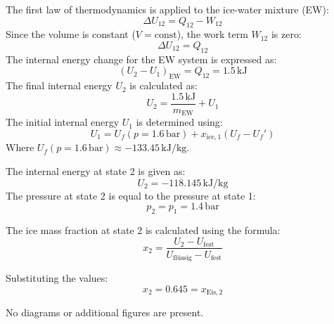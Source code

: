 The first law of thermodynamics is applied to the ice-water mixture (EW):  
\[
\Delta U_{12} = Q_{12} - W_{12}
\]  
Since the volume is constant (\( V = \text{const} \)), the work term \( W_{12} \) is zero:  
\[
\Delta U_{12} = Q_{12}
\]  
The internal energy change for the EW system is expressed as:  
\[
(U_2 - U_1)_{\text{EW}} = Q_{12} = 1.5 \, \text{kJ}
\]  
The final internal energy \( U_2 \) is calculated as:  
\[
U_2 = \frac{1.5 \, \text{kJ}}{m_{\text{EW}}} + U_1
\]  
The initial internal energy \( U_1 \) is determined using:  
\[
U_1 = U_f(p = 1.6 \, \text{bar}) + x_{\text{ice},1}(U_f - U_f')
\]  
Where \( U_f(p = 1.6 \, \text{bar}) \approx -133.45 \, \text{kJ/kg} \).

The internal energy at state 2 is given as:  
\[
U_2 = -118.145 \, \text{kJ/kg}
\]  
The pressure at state 2 is equal to the pressure at state 1:  
\[
p_2 = p_1 = 1.4 \, \text{bar}
\]  

The ice mass fraction at state 2 is calculated using the formula:  
\[
x_2 = \frac{U_2 - U_{\text{fest}}}{U_{\text{flüssig}} - U_{\text{fest}}}
\]  

Substituting the values:  
\[
x_2 = 0.645 = x_{\text{Eis},2}
\]  

No diagrams or additional figures are present.